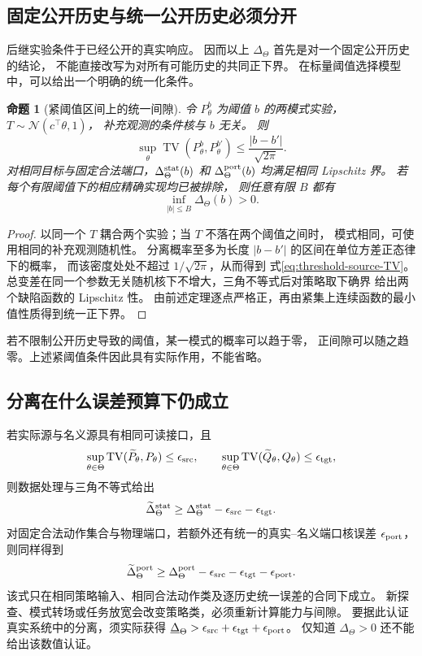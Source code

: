 \documentclass[UTF8,fontset=fandol,zihao=5,a4paper]{ctexart}
\newtheorem{proposition}[theorem]{命题}
\theoremstyle{definition}
\theoremstyle{remark}\newtheorem{remark}[theorem]{说明}
\numberwithin{equation}{section}
\begin{document}
\subsection{固定公开历史与统一公开历史必须分开}

后继实验条件于已经公开的真实响应。
因而以上 $\Delta_\Theta$ 首先是对一个固定公开历史的结论，
不能直接改写为对所有可能历史的共同正下界。
在标量阈值选择模型中，可以给出一个明确的统一化条件。

\begin{proposition}[紧阈值区间上的统一间隙]
\label{prop:threshold-uniform-gap}
令 $P_\theta^b$ 为阈值 $b$ 的两模式实验，
$T\sim\mathcal N(c^\top\theta,1)$，
补充观测的条件核与 $b$ 无关。
则
\begin{equation}
 \sup_\theta\operatorname{TV}(P_\theta^b,P_\theta^{b'})
 \leq\frac{|b-b'|}{\sqrt{2\pi}}.
 \label{eq:threshold-source-TV}
\end{equation}
对相同目标与固定合法端口，$\Delta_\Theta^{\rm stat}(b)$
和 $\Delta_\Theta^{\rm port}(b)$ 均满足相同 Lipschitz 界。
若每个有限阈值下的相应精确实现均已被排除，
则任意有限 $B$ 都有
\[
 \inf_{|b|\leq B}\Delta_\Theta(b)>0.
\]
\end{proposition}

\begin{proof}
以同一个 $T$ 耦合两个实验；当 $T$ 不落在两个阈值之间时，
模式相同，可使用相同的补充观测随机性。
分离概率至多为长度 $|b-b'|$ 的区间在单位方差正态律下的概率，
而该密度处处不超过 $1/\sqrt{2\pi}$，从而得到
式\eqref{eq:threshold-source-TV}。
总变差在同一个参数无关随机核下不增大，三角不等式后对策略取下确界
给出两个缺陷函数的 Lipschitz 性。
由前述定理逐点严格正，再由紧集上连续函数的最小值性质得到统一正下界。
\end{proof}

若不限制公开历史导致的阈值，某一模式的概率可以趋于零，
正间隙可以随之趋零。上述紧阈值条件因此具有实际作用，不能省略。

\subsection{分离在什么误差预算下仍成立}

若实际源与名义源具有相同可读接口，且
\[
 \sup_{\theta\in\Theta}\operatorname{TV}(\widetilde P_\theta,P_\theta)
 \leq\epsilon_{\rm src},\qquad
 \sup_{\theta\in\Theta}\operatorname{TV}(\widetilde Q_\theta,Q_\theta)
 \leq\epsilon_{\rm tgt},
\]
则数据处理与三角不等式给出
\begin{equation}
 \widetilde\Delta_\Theta^{\rm stat}
 \geq\Delta_\Theta^{\rm stat}
 -\epsilon_{\rm src}-\epsilon_{\rm tgt}.
 \label{eq:gap-perturbation}
\end{equation}
对固定合法动作集合与物理端口，若额外还有统一的真实--名义端口核误差
$\epsilon_{\rm port}$，则同样得到
\[
 \widetilde\Delta_\Theta^{\rm port}
 \geq\Delta_\Theta^{\rm port}
 -\epsilon_{\rm src}-\epsilon_{\rm tgt}-\epsilon_{\rm port}.
\]
该式只在相同策略输入、相同合法动作类及逐历史统一误差的合同下成立。
新探查、模式转场或任务放宽会改变策略类，必须重新计算能力与间隙。
要据此认证真实系统中的分离，须实际获得
$\underline\Delta_\Theta>\epsilon_{\rm src}+
\epsilon_{\rm tgt}+\epsilon_{\rm port}$。
仅知道 $\Delta_\Theta>0$ 还不能给出该数值认证。
\end{document}
